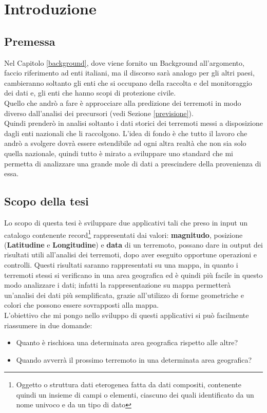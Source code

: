 \chapter*{Introduzione}

\section*{Premessa}
Nel Capitolo \ref{background}, dove viene fornito un Background all'argomento, faccio riferimento ad enti italiani, ma il discorso sar\`a analogo per gli altri paesi, cambieranno soltanto gli enti che si occupano della raccolta e del monitoraggio dei dati e, gli enti che hanno scopi di protezione civile.\\
Quello che andr\`o a fare \`e approcciare alla predizione dei terremoti in modo diverso dall'analisi dei precursori (vedi Sezione \ref{previsione}).\\
Quindi prender\`o in analisi soltanto i dati storici dei terremoti messi a disposizione dagli enti nazionali che li raccolgono. L'idea di fondo \`e che tutto il lavoro che andr\`o a svolgere dovr\`a essere estendibile ad ogni altra realt\`a che non sia solo quella nazionale, quindi tutto \`e mirato a sviluppare uno standard che mi permetta di analizzare una grande mole di dati a prescindere della provenienza di essa.


\section*{Scopo della tesi}
Lo scopo di questa tesi \`e sviluppare due applicativi tali che preso in input un catalogo contenente record\footnote{Oggetto o struttura dati eterogenea fatta da dati compositi, contenente quindi un insieme di campi o elementi, ciascuno dei quali identificato da un nome univoco e da un tipo di dato} rappresentati dai valori: \textbf{magnitudo}, posizione (\textbf{Latitudine} e \textbf{Longitudine}) e \textbf{data} di un terremoto, possano dare in output dei risultati utili all'analisi dei terremoti, dopo aver eseguito opportune operazioni e controlli. Questi risultati saranno rappresentati su una mappa, in quanto i terremoti stessi si verificano in una area geografica ed \`e quindi pi\`u facile in questo modo analizzare i dati; infatti la rappresentazione su mappa permetter\`a un'analisi dei dati pi\`u semplificata, grazie all'utilizzo di forme geometriche e colori che possono essere sovrapposti alla mappa.\\
L'obiettivo che mi pongo nello sviluppo di questi applicativi si pu\`o facilmente riassumere in due domande:
\begin{itemize}
    \item Quanto \`e rischiosa una determinata area geografica rispetto alle altre?
    \item Quando avverr\`a il prossimo terremoto in una determinata area geografica?
\end{itemize}